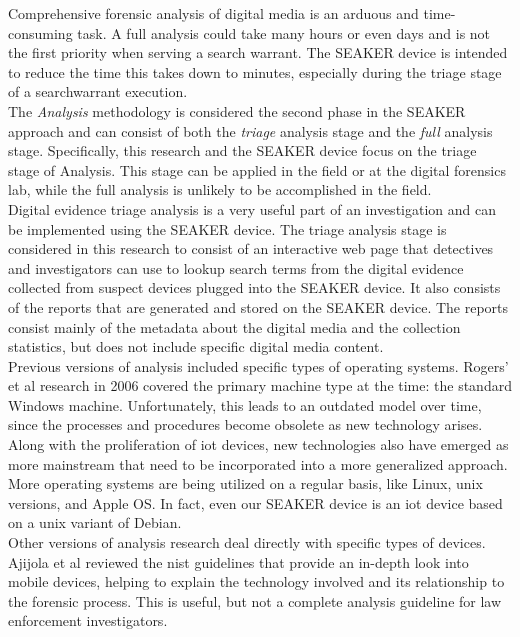 \documentclass[12pt]{article}
\begin{document}
Comprehensive forensic analysis of digital media is an arduous and time-consuming task.  A full
analysis could take many hours or even days and is not the first priority when serving a search
warrant.  The SEAKER device is intended to reduce the time this takes down to minutes,
especially during the triage stage of a \gls{searchwarrant} execution.\\

The {\em Analysis} methodology is considered the second phase in the SEAKER approach and 
can consist of both the {\em triage} analysis stage and the {\em full} analysis stage.
Specifically, this research and the SEAKER device focus on the triage stage of Analysis.  This
stage can be applied in the field or at the digital forensics lab, while the full analysis
is unlikely to be accomplished in the field.\\

Digital evidence triage analysis is a very useful part of an investigation and can be 
implemented using the SEAKER device.  The triage analysis stage is considered in this research
to consist of an interactive web page that detectives and investigators can use to 
lookup search terms from the digital evidence collected from suspect devices plugged into the
SEAKER device.  It also consists of the reports that are generated and stored on the
SEAKER device.  The reports consist mainly of the metadata about the digital media and the
collection statistics, but does not include specific digital media content.\\

Previous versions of analysis included specific types of operating systems.
Rogers' et al\cite{rogers2006computer} research in 2006 covered the primary machine type at
the time: the standard Windows machine.  Unfortunately, this leads to an outdated model over
time, since the processes and procedures become obsolete as new technology arises.  Along with
the proliferation of \gls{iot} devices, new technologies also have emerged as more mainstream that
need to be incorporated into a more generalized approach.  More operating systems are being
utilized on a regular basis, like Linux, unix versions, and Apple OS.  In fact, even our
SEAKER device is an \gls{iot} device based on a unix variant of Debian.\\

Other versions of analysis research deal directly with specific types of devices.
Ajijola et al\cite{ajijola2014review} reviewed the \gls{nist} guidelines that provide an in-depth
look into mobile devices, helping to explain the technology involved and its
relationship to the forensic process. This is useful, but not a complete analysis
guideline for law enforcement investigators.\\
\end{document}
